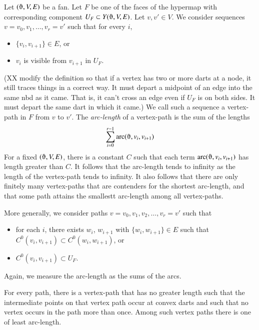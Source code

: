 Let $(\orgn,V,E)$ be a fan.   
Let $F$ be one of the faces of the
hypermap with corresponding component $U_F\subset Y(\orgn,V,E)$.
Let $v,v'\in V$.    We consider sequences
$v=v_0,v_1,\ldots,v_r=v'$ such that for every $i$,
\begin{itemize}
  \item $\{v_i,v_{i+1}\} \in E$, or
  \item $v_i$ is visible from $v_{i+1}$ in $U_F$.
\end{itemize}
(XX modify the definition so that if a vertex has two or more darts
at a node, it still traces things in a correct way. It must depart
a midpoint of an edge into the same nbd as it came. That is, it
can't cross an edge even if $U_F$ is on both sides.  It must depart
the same dart in which it came.)
We call such a sequence a vertex-path in $F$ from $v$ to $v'$.
The {\it arc-length} of a vertex-path is the sum of the lengths
$$
\sum_{i=0}^{r-1}\arc(\orgn,v_i,v_{i+1})
$$
For a fixed $(\orgn,V,E)$, there is a constant $C$ such that
each term $\arc(\orgn,v_i,v_{i+1})$ has length greater than $C$.  It
follows that the arc-length tends to infinity as the length of
the vertex-path tends to infinity.  It also follows that there are only
finitely many vertex-paths that are contenders for the shortest arc-length,
and that some path attains the smallestt arc-length among all vertex-paths.

More generally, we consider paths
$v=v_0,v_1,v_2,\ldots,v_r=v'$ such that 
\begin{itemize}
\item for each $i$, there exists $w_i$, $w_{i+1}$ with $\{w_i,w_{i+1}\}\in E$
such that $C^0(v_i,v_{i+1})\subset C^0(w_i,w_{i+1})$, or
\item $C^0(v_i,v_{i+1})\subset U_F$.
\end{itemize}
Again, we measure the arc-length as the sums of the arcs.

\begin{lemma}
For every path, there is a vertex-path that has no greater length
such that the intermediate points on that vertex path occur at convex darts
and such that no vertex occurs in the path more than once.
Among such vertex paths there is one of least arc-length.
\end{lemma}

